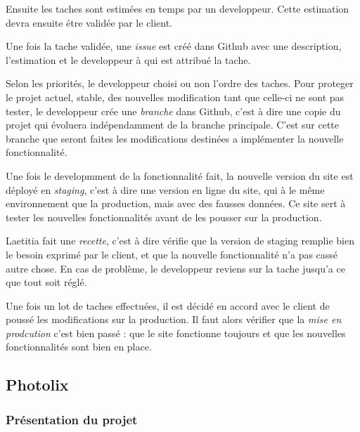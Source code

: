 \documentclass[12pt,a4paper]{article}
\begin{document}
  \bigskip

  Ensuite les taches sont estimées en temps par un developpeur. Cette
  estimation devra ensuite étre validée par le client.

  \bigskip

  Une fois la tache validée, une \emph{issue} est créé dans Github avec
  une description, l'estimation et le developpeur à qui est attribué la
  tache.

  \bigskip

  Selon les priorités, le developpeur choisi ou non l'ordre des taches.
  Pour proteger le projet actuel, stable, des nouvelles modification tant
  que celle-ci ne sont pas tester, le developpeur crée une \emph{branche}
  dans Github, c'est à dire une copie du projet qui évoluera
  indépendamment de la branche principale. C'est sur cette branche que
  seront faites les modifications destinées a implémenter la nouvelle
  fonctionnalité.

  \bigskip

  Une fois le developmment de la fonctionnalité fait, la nouvelle version
  du site est déployé en \emph{staging}, c'est à dire une version en ligne
  du site, qui à le même environnement que la production, mais avec des
  fausses données. Ce site sert à tester les nouvelles fonctionnalités
  avant de les pousser sur la production.

  \bigskip

  Laetitia fait une \emph{recette}, c'est à dire vérifie que la version de
  staging remplie bien le besoin exprimé par le client, et que la nouvelle
  fonctionnalité n'a pas cassé autre chose. En cas de problème, le
  developpeur reviens sur la tache jusqu'a ce que tout soit réglé.

  \bigskip

  Une fois un lot de taches effectuées, il est décidé en accord avec le
  client de poussé les modifications sur la production. Il faut alors
  vérifier que la \emph{mise en prodcution} c'est bien passé : que le site
  fonctionne toujours et que les nouvelles fonctionnalités sont bien en
  place.

  \bigskip

  \subsection{Photolix}\label{photolix}

  \subsubsection{Présentation du projet}\label{pruxe9sentation-du-projet}
\end{document}
